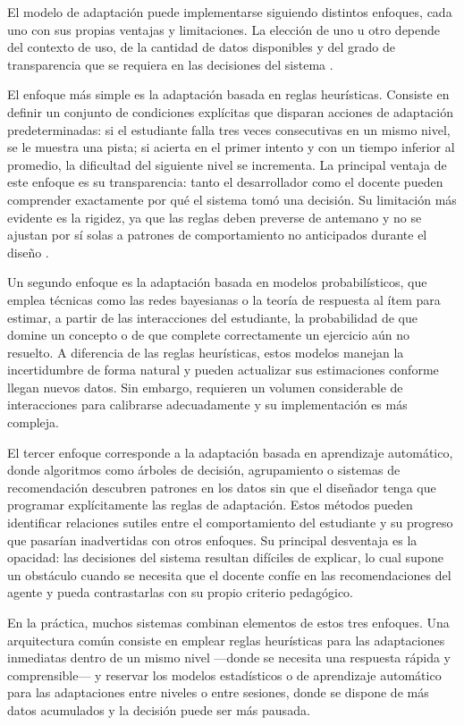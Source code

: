 El modelo de adaptación puede implementarse siguiendo distintos enfoques, cada uno
con sus propias ventajas y limitaciones. La elección de uno u otro depende del
contexto de uso, de la cantidad de datos disponibles y del grado de transparencia
que se requiera en las decisiones del sistema \cite{shum_personalised_2023}.

El enfoque más simple es la adaptación basada en reglas heurísticas.
Consiste en definir un conjunto de condiciones explícitas que disparan acciones
de adaptación predeterminadas: si el estudiante falla tres veces consecutivas en
un mismo nivel, se le muestra una pista; si acierta en el primer intento y con
un tiempo inferior al promedio, la dificultad del siguiente nivel se incrementa.
La principal ventaja de este enfoque es su transparencia: tanto el desarrollador
como el docente pueden comprender exactamente por qué el sistema tomó una decisión.
Su limitación más evidente es la rigidez, ya que las reglas deben preverse de
antemano y no se ajustan por sí solas a patrones de comportamiento no anticipados
durante el diseño \cite{shum_personalised_2023}.

Un segundo enfoque es la adaptación basada en modelos probabilísticos,
que emplea técnicas como las redes bayesianas o la teoría de respuesta al ítem
para estimar, a partir de las interacciones del estudiante, la probabilidad de
que domine un concepto o de que complete correctamente un ejercicio aún no resuelto.
A diferencia de las reglas heurísticas, estos modelos manejan la incertidumbre
de forma natural y pueden actualizar sus estimaciones conforme llegan nuevos datos.
Sin embargo, requieren un volumen considerable de interacciones para calibrarse
adecuadamente y su implementación es más compleja.

El tercer enfoque corresponde a la adaptación basada en aprendizaje
	automático, donde algoritmos como árboles de decisión, agrupamiento o sistemas
de recomendación descubren patrones en los datos sin que el diseñador tenga que
programar explícitamente las reglas de adaptación. Estos métodos pueden identificar
relaciones sutiles entre el comportamiento del estudiante y su progreso que pasarían
inadvertidas con otros enfoques. Su principal desventaja es la opacidad: las
decisiones del sistema resultan difíciles de explicar, lo cual supone un obstáculo
cuando se necesita que el docente confíe en las recomendaciones del agente y
pueda contrastarlas con su propio criterio pedagógico.

En la práctica, muchos sistemas combinan elementos de estos tres enfoques. Una
arquitectura común consiste en emplear reglas heurísticas para las adaptaciones
inmediatas dentro de un mismo nivel —donde se necesita una respuesta rápida y
comprensible— y reservar los modelos estadísticos o de aprendizaje automático para
las adaptaciones entre niveles o entre sesiones, donde se dispone de más datos
acumulados y la decisión puede ser más pausada.

